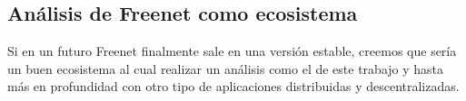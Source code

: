 
\subsection{Análisis de Freenet como ecosistema}

Si en un futuro Freenet finalmente sale en una versión estable, creemos que sería un buen ecosistema al cual realizar un análisis como el de este trabajo y hasta más en profundidad con otro tipo de aplicaciones distribuidas y descentralizadas.